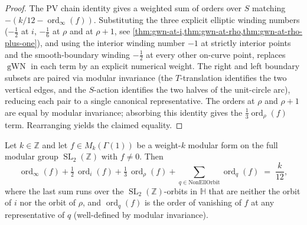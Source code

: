 \begin{proof}
  \leanok
  The PV chain identity gives a weighted sum of orders over $S$
  matching $-(k/12 - \operatorname{ord}_\infty(f))$. Substituting the
  three explicit elliptic winding numbers ($-\tfrac{1}{2}$ at $i$,
  $-\tfrac{1}{6}$ at $\rho$ and at $\rho+1$, see
  \cref{thm:gwn-at-i,thm:gwn-at-rho,thm:gwn-at-rho-plus-one}), and
  using the interior winding number $-1$ at strictly interior points
  and the smooth-boundary winding $-\tfrac{1}{2}$ at every other
  on-curve point, replaces $\operatorname{gWN}$ in each term by an
  explicit numerical weight. The right and left boundary subsets are
  paired via modular invariance (the $T$-translation identifies the
  two vertical edges, and the $S$-action identifies the two halves
  of the unit-circle arc), reducing each pair to a single canonical
  representative. The orders at $\rho$ and $\rho+1$ are equal by
  modular invariance; absorbing this identity gives the
  $\tfrac{1}{3}\operatorname{ord}_\rho(f)$ term. Rearranging yields
  the claimed equality.
\end{proof}

\begin{theorem}
  \label{thm:valence-formula-textbook}
  \leanok
  Let $k \in \mathbb{Z}$ and let $f \in M_k(\Gamma(1))$ be a weight-$k$
  modular form on the full modular group $\operatorname{SL}_2(\mathbb{Z})$
  with $f \ne 0$. Then
  \[
    \operatorname{ord}_\infty(f) +
      \tfrac{1}{2}\,\operatorname{ord}_{i}(f) +
      \tfrac{1}{3}\,\operatorname{ord}_{\rho}(f) +
      \sum_{q \in \mathrm{NonEllOrbit}} \operatorname{ord}_{q}(f)
    \;=\; \frac{k}{12},
  \]
  where the last sum runs over the $\operatorname{SL}_2(\mathbb{Z})$-orbits
  in $\mathbb{H}$ that are neither the orbit of $i$ nor the orbit of
  $\rho$, and $\operatorname{ord}_q(f)$ is the order of vanishing of
  $f$ at any representative of $q$ (well-defined by modular
  invariance).
\end{theorem}


